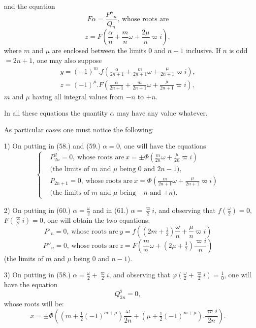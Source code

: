 \documentclass{article}
\begin{document}

and the equation
\[ F\alpha=\frac{P''_n}{Q_n},\ \text{whose roots are} \]
\[ z=F\left(\frac{\alpha}{n}+\frac{m}{n}\omega+\frac{2\mu}{n}\varpi i\right), \tag{61.} \]
where $m$ and $\mu$ are enclosed between the limits 0 and $n-1$ inclusive. If $n$ is odd $=2n+1$, one may also suppose
\[ \begin{gathered} y=(-1)^{m}.f\left(\frac{\alpha}{2n+1}+\frac{m}{2n+1}\omega+\frac{\mu}{2n+1}\varpi i\right),\\ z=(-1)^{\mu}.F\left(\frac{\alpha}{2n+1}+\frac{m}{2n+1}\omega+\frac{\mu}{2n+1}\varpi i\right), \end{gathered} \]
$m$ and $\mu$ having all integral values from $-n$ to $+n$.

In all these equations the quantity $\alpha$ may have any value whatever.

As particular cases one must notice the following:

1) On putting in (58.) and (59.) $\alpha=0$, one will have the equations
\[ \left\{\begin{aligned} &P_{2n}^{2}=0,\ \text{whose roots are}\ x=\pm\Phi\left(\frac{m}{2n}\omega+\frac{\mu}{2n}\varpi i\right)\\ &\text{(the limits of $m$ and $\mu$ being 0 and $2n-1$),}\\ &P_{2n+1}=0,\ \text{whose roots are}\ x=\Phi\left(\frac{m}{2n+1}\omega+\frac{\mu}{2n+1}\varpi i\right)\\ &\text{(the limits of $m$ and $\mu$ being $-n$ and $+n$).} \end{aligned}\right. \tag{62.} \]

2) On putting in (60.) $\alpha=\frac{\omega}{2}$ and in (61.) $\alpha=\frac{\varpi}{2}i$, and observing that $f\left(\frac{\omega}{2}\right)=0$, $F\left(\frac{\varpi}{2}i\right)=0$, one will obtain the two equations:
\[ P'_n=0,\ \text{whose roots are}\ y=f\left((2m+\tfrac{1}{2})\frac{\omega}{n}+\frac{\mu}{n}\varpi i\right) \tag{63.} \]
\[ P''_n=0,\ \text{whose roots are}\ z=F\left(\frac{m}{n}\omega+(2\mu+\tfrac{1}{2})\frac{\varpi i}{n}\right) \tag{64.} \]
(the limits of $m$ and $\mu$ being 0 and $n-1$).

3) On putting in (58.) $\alpha=\frac{\omega}{2}+\frac{\varpi}{2}i$, and observing that $\varphi\left(\frac{\omega}{2}+\frac{\varpi}{2}i\right)=\frac{1}{0}$, one will have the equation
\[ Q_{2n}^{2}=0, \]
whose roots will be:
\[ x=\pm\Phi\left((m+\tfrac{1}{2}(-1)^{m+\mu})\frac{\omega}{2n}+(\mu+\tfrac{1}{2}(-1)^{m+\mu}).\frac{\varpi i}{2n}\right). \]
\end{document}
